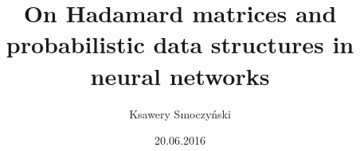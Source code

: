 \documentclass{praca-dyplomowa}
\title{On Hadamard matrices and probabilistic data structures in neural networks}
\author{Ksawery Smoczyński}
\date{20.06.2016}
\begin{document}
\Titlepage      
\Statement      
\tableofcontents 













\printbibliography
\end{document}
